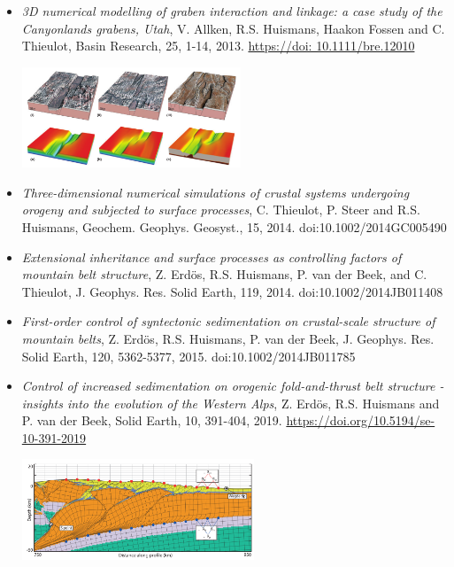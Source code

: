 \begin{itemize}
\item {\it 3D numerical modelling of graben interaction and linkage: a case study of the Canyonlands grabens, Utah}, 
V. Allken, R.S. Huismans, Haakon Fossen and C. Thieulot, Basin Research, 25, 1-14, 2013.
\url{https://doi: 10.1111/bre.12010}

\begin{center}
\includegraphics[height=3cm]{images/mycodes/alhf13_img}
\end{center}


\item {\it Three-dimensional numerical simulations of crustal systems undergoing orogeny and subjected to surface processes}, 
C. Thieulot, P. Steer and R.S. Huismans, Geochem. Geophys. Geosyst., 15, 2014. doi:10.1002/2014GC005490

\item {\it Extensional inheritance and surface processes as controlling factors of mountain belt structure}, 
Z. Erd\"os, R.S. Huismans, P. van der Beek, and C. Thieulot, J. Geophys. Res. Solid Earth, 119, 2014. doi:10.1002/2014JB011408

\item {\it First-order control of syntectonic sedimentation on crustal-scale structure of mountain belts}, 
Z. Erd\"os, R.S. Huismans, P. van der Beek, J. Geophys. Res. Solid Earth, 120, 5362-5377, 2015. doi:10.1002/2014JB011785

\item {\it Control of increased sedimentation on orogenic fold-and-thrust belt structure - insights into the evolution of the Western Alps}, 
Z. Erd\"os, R.S. Huismans and P. van der Beek, Solid Earth, 10, 391-404, 2019.
\url{https://doi.org/10.5194/se-10-391-2019}

\begin{center}
\includegraphics[height=3cm]{images/mycodes/erhv19_img}
\end{center}

\end{itemize}

